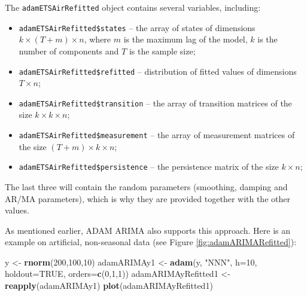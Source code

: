 \documentclass[]{book}
\newenvironment{Shaded}{\begin{snugshade}}{\end{snugshade}}
\newcommand{\DataTypeTok}[1]{\textcolor[rgb]{0.13,0.29,0.53}{#1}}
\newcommand{\DecValTok}[1]{\textcolor[rgb]{0.00,0.00,0.81}{#1}}
\newcommand{\KeywordTok}[1]{\textcolor[rgb]{0.13,0.29,0.53}{\textbf{#1}}}
\newcommand{\NormalTok}[1]{#1}
\newcommand{\OtherTok}[1]{\textcolor[rgb]{0.56,0.35,0.01}{#1}}
\newcommand{\StringTok}[1]{\textcolor[rgb]{0.31,0.60,0.02}{#1}}
\providecommand{\tightlist}{%
  \setlength{\itemsep}{0pt}\setlength{\parskip}{0pt}}
\theoremstyle{definition}
\theoremstyle{definition}
\theoremstyle{definition}
\theoremstyle{definition}
\theoremstyle{remark}
\begin{document}
The \texttt{adamETSAirRefitted} object contains several variables, including:

\begin{itemize}
\tightlist
\item
  \texttt{adamETSAirRefitted\$states} -- the array of states of dimensions \(k \times (T+m) \times n\), where \(m\) is the maximum lag of the model, \(k\) is the number of components and \(T\) is the sample size;
\item
  \texttt{adamETSAirRefitted\$refitted} -- distribution of fitted values of dimensions \(T \times n\);
\item
  \texttt{adamETSAirRefitted\$transition} -- the array of transition matrices of the size \(k \times k \times n\);
\item
  \texttt{adamETSAirRefitted\$measurement} -- the array of measurement matrices of the size \((T+m) \times k \times n\);
\item
  \texttt{adamETSAirRefitted\$persistence} -- the persistence matrix of the size \(k \times n\);
\end{itemize}

The last three will contain the random parameters (smoothing, damping and AR/MA parameters), which is why they are provided together with the other values.

As mentioned earlier, ADAM ARIMA also supports this approach. Here is an example on artificial, non-seasonal data (see Figure \ref{fig:adamARIMARefitted}):

\begin{Shaded}
\begin{Highlighting}[]
\NormalTok{y <-}\StringTok{ }\KeywordTok{rnorm}\NormalTok{(}\DecValTok{200}\NormalTok{,}\DecValTok{100}\NormalTok{,}\DecValTok{10}\NormalTok{)}
\NormalTok{adamARIMAy1 <-}\StringTok{ }\KeywordTok{adam}\NormalTok{(y, }\StringTok{"NNN"}\NormalTok{, }\DataTypeTok{h=}\DecValTok{10}\NormalTok{, }\DataTypeTok{holdout=}\OtherTok{TRUE}\NormalTok{,}
                    \DataTypeTok{orders=}\KeywordTok{c}\NormalTok{(}\DecValTok{0}\NormalTok{,}\DecValTok{1}\NormalTok{,}\DecValTok{1}\NormalTok{))}
\NormalTok{adamARIMAyRefitted1 <-}\StringTok{ }\KeywordTok{reapply}\NormalTok{(adamARIMAy1)}
\KeywordTok{plot}\NormalTok{(adamARIMAyRefitted1)}
\end{Highlighting}
\end{Shaded}
\end{document}
